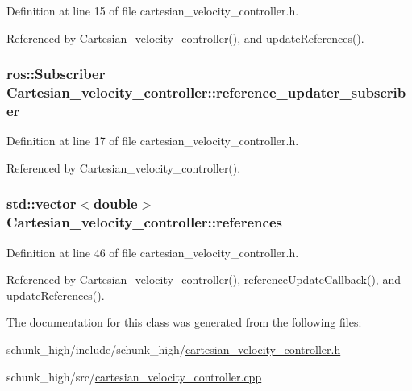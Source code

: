 Definition at line 15 of file cartesian\-\_\-velocity\-\_\-controller.\-h.



Referenced by Cartesian\-\_\-velocity\-\_\-controller(), and update\-References().

\hypertarget{classCartesian__velocity__controller_a75412b9859afe4b800f9613c9cb8d17f}{
\subsubsection[{reference\-\_\-updater\-\_\-subscriber}]{\setlength{\rightskip}{0pt plus 5cm}ros\-::\-Subscriber Cartesian\-\_\-velocity\-\_\-controller\-::reference\-\_\-updater\-\_\-subscriber\hspace{0.3cm}{\ttfamily [protected]}}}\label{classCartesian__velocity__controller_a75412b9859afe4b800f9613c9cb8d17f}


Definition at line 17 of file cartesian\-\_\-velocity\-\_\-controller.\-h.



Referenced by Cartesian\-\_\-velocity\-\_\-controller().

\hypertarget{classCartesian__velocity__controller_afc3792f1f6dd0025417d752a89e519e1}{
\subsubsection[{references}]{\setlength{\rightskip}{0pt plus 5cm}std\-::vector$<$double$>$ Cartesian\-\_\-velocity\-\_\-controller\-::references}}\label{classCartesian__velocity__controller_afc3792f1f6dd0025417d752a89e519e1}


Definition at line 46 of file cartesian\-\_\-velocity\-\_\-controller.\-h.



Referenced by Cartesian\-\_\-velocity\-\_\-controller(), reference\-Update\-Callback(), and update\-References().



The documentation for this class was generated from the following files\-:\begin{DoxyCompactItemize}
\item 
schunk\-\_\-high/include/schunk\-\_\-high/\hyperlink{cartesian__velocity__controller_8h}{cartesian\-\_\-velocity\-\_\-controller.\-h}\item 
schunk\-\_\-high/src/\hyperlink{cartesian__velocity__controller_8cpp}{cartesian\-\_\-velocity\-\_\-controller.\-cpp}\end{DoxyCompactItemize}
